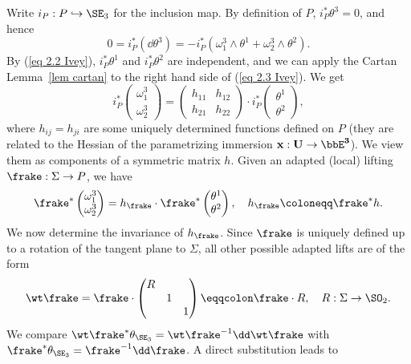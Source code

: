 Write $i_P:P\hookrightarrow \SE_3$ for the inclusion map. By definition of $P$, $i_P^\ast\theta^3=0$, and hence 
\[0=i_P^\ast(\dd\theta^3)=-i_P^\ast(\omega_1^3\wedge\theta^1+\omega_2^3\wedge\theta^2).\label{eq 2.3 Ivey}\]
By (\ref{eq 2.2 Ivey}), $i_P^\ast\theta^1$ and $i_P^\ast\theta^2$ are independent, and we can apply the Cartan Lemma~\ref{lem cartan} to the right hand side of (\ref{eq 2.3 Ivey}). We get 
\[i_P^\ast 
\begin{pmatrix}
    \omega_1^3 \\ \omega_2^3
\end{pmatrix}
=
\begin{pmatrix}
    h_{11} & h_{12}\\ h_{21} & h_{22}
\end{pmatrix}\cdot
i_P^\ast 
\begin{pmatrix}
    \theta^1 \\ \theta^2
\end{pmatrix},\label{def h}
\]
where $h_{ij}=h_{ji}$ are some uniquely determined functions defined on $P$ (they are related to the Hessian of the parametrizing immersion $\bf{x}:U\to \bbE^3$). We view them as components of a symmetric matrix $h$. Given an adapted (local) lifting $\frake:\Sigma\to P$, we have 
\[\frake^\ast \begin{pmatrix}
    \omega_1^3 \\ \omega_2^3
\end{pmatrix}=
h_\frake \cdot \frake^\ast \begin{pmatrix}
    \theta^1 \\ \theta^2
\end{pmatrix},\quad h_\frake\coloneqq \frake^\ast h.
\]
We now determine the invariance of $h_\frake$. Since $\frake$ is uniquely defined up to a rotation of the tangent plane to $\Sigma$, all other possible adapted lifts are of the form
\[\wt\frake=\frake\cdot\begin{pmatrix}
    R &&\\
    &1 &\\
    &&1
\end{pmatrix}\eqqcolon \frake\cdot R,\quad R:\Sigma\to \SO_2.
\]
We compare $\wt\frake^\ast \theta_{\SE_3}=\wt\frake^{-1}\dd \wt\frake$ with $\frake^\ast\theta_{\SE_3}=\frake^{-1}\dd\frake$. A direct substitution leads to 
